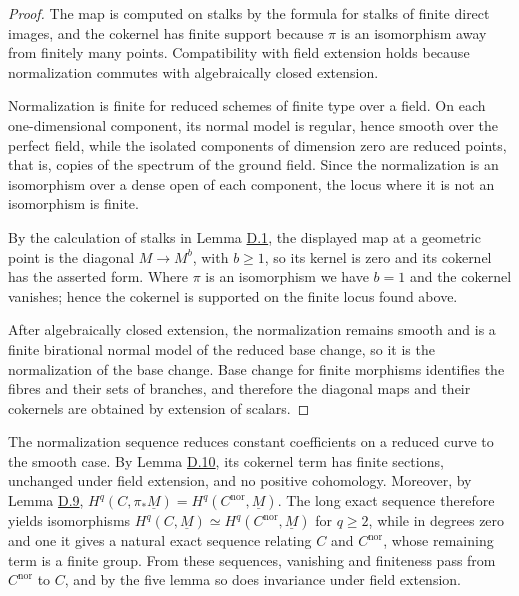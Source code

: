 \documentclass[11pt]{article}
\begin{document}
\begin{proof}[{Proof}]\label{bp37}%
The map is computed on stalks by the formula for stalks of finite direct images, and the cokernel has finite support because \(\pi\) is an isomorphism away from finitely many points. Compatibility with field extension holds because normalization commutes with algebraically closed extension.

Normalization is finite for reduced schemes of finite type over a field.  On each one-dimensional component, its normal model is regular, hence smooth over the perfect field, while the isolated components of dimension zero are reduced points, that is, copies of the spectrum of the ground field.  Since the normalization is an isomorphism over a dense open of each component, the locus where it is not an isomorphism is finite.

By the calculation of stalks in Lemma \hyperref[bp3]{D.1}, the displayed map at a geometric point is the diagonal \(M\to M^b\), with \(b\geq1\), so its kernel is zero and its cokernel has the asserted form.  Where \(\pi\) is an isomorphism we have \(b=1\) and the cokernel vanishes; hence the cokernel is supported on the finite locus found above.

After algebraically closed extension, the normalization remains smooth and is a finite birational normal model of the reduced base change, so it is the normalization of the base change.  Base change for finite morphisms identifies the fibres and their sets of branches, and therefore the diagonal maps and their cokernels are obtained by extension of scalars.
\end{proof}

\label{bp38}%
The normalization sequence reduces constant coefficients on a reduced curve to the smooth case. By Lemma \hyperref[bp33]{D.10}, its cokernel term has finite sections, unchanged under field extension, and no positive cohomology. Moreover, by Lemma \hyperref[bp30]{D.9}, \(H^q(C,\pi_*\underline M)=H^q(C^{\mathrm{nor}},\underline M)\). The long exact sequence therefore yields isomorphisms \(H^q(C,\underline M)\simeq H^q(C^{\mathrm{nor}},\underline M)\) for \(q\geq2\), while in degrees zero and one it gives a natural exact sequence relating \(C\) and \(C^{\mathrm{nor}}\), whose remaining term is a finite group. From these sequences, vanishing and finiteness pass from \(C^{\mathrm{nor}}\) to \(C\), and by the five lemma so does invariance under field extension.
\end{document}
